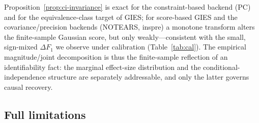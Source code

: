 \documentclass{article}
\theoremstyle{plain}
\theoremstyle{definition}
\theoremstyle{remark}
\begin{document}
Proposition~\ref{prop:ci-invariance} is exact for the constraint-based backend (PC) and for the equivalence-class target of GIES; for score-based GIES and the covariance/precision backends (NOTEARS, inspre) a monotone transform alters the finite-sample Gaussian score, but only weakly---consistent with the small, sign-mixed $\Delta F_1$ we observe under calibration (Table~\ref{tab:cal}). The empirical magnitude/joint decomposition is thus the finite-sample reflection of an identifiability fact: the marginal effect-size distribution and the conditional-independence structure are separately addressable, and only the latter governs causal recovery.

\subsection{Full limitations}
\label{app:limitations}
\end{document}
